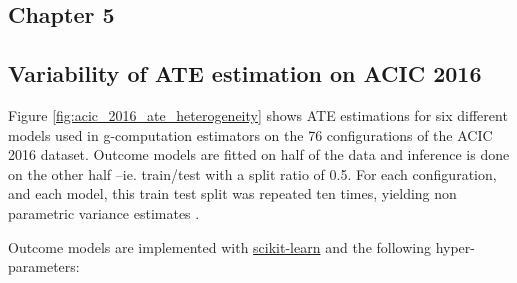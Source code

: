 \documentclass{report}
\begin{document}
\clearpage
\begin{appendices}



  \chapter{Chapter 5}\label{apd:causal_model_selection}


  \section{Variability of ATE estimation on ACIC 2016}%

  \label{apd:toy_example:acic_2016_ate_variability}%

  Figure \ref{fig:acic_2016_ate_heterogeneity} shows ATE estimations for six
  different models used in g-computation estimators on the 76 configurations of
  the ACIC 2016 dataset. Outcome models are fitted on half of the data and
  inference is done on the other half --ie. train/test with a split ratio of 0.5.
  For each configuration, and each model, this train test split was repeated ten
  times, yielding non parametric variance estimates
  \citep{bouthillier_accounting_2021}.

  Outcome models are implemented with
  \href{https://scikit-learn.org/stable/}{scikit-learn}
  \citep{pedregosa_scikitlearn_2011} and the following hyper-parameters:

  \begin{table}[h!]
    \centering
\end{table}
\end{appendices}
\end{document}
